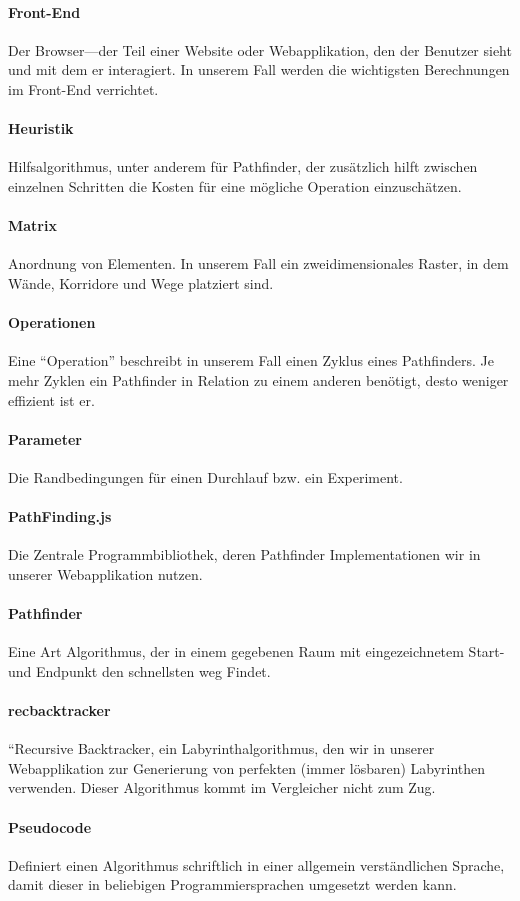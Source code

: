 \paragraph{Front-End} Der Browser---der Teil einer Website oder Webapplikation, den der Benutzer sieht und mit dem er interagiert. In unserem Fall werden die wichtigsten Berechnungen im Front-End verrichtet.
\paragraph{Heuristik} Hilfsalgorithmus, unter anderem für Pathfinder, der zusätzlich hilft zwischen einzelnen Schritten die Kosten für eine mögliche Operation einzuschätzen.
\paragraph{Matrix} Anordnung von Elementen. In unserem Fall ein zweidimensionales Raster, in dem Wände, Korridore und Wege platziert sind.
\paragraph{Operationen} Eine ``Operation'' beschreibt in unserem Fall einen Zyklus eines Pathfinders. Je mehr Zyklen ein Pathfinder in Relation zu einem anderen benötigt, desto weniger effizient ist er.
\paragraph{Parameter} Die Randbedingungen für einen Durchlauf bzw. ein Experiment.
\paragraph{PathFinding.js} Die Zentrale Programmbibliothek, deren Pathfinder Implementationen wir in unserer Webapplikation nutzen.
\paragraph{Pathfinder} Eine Art Algorithmus, der in einem gegebenen Raum mit eingezeichnetem Start- und Endpunkt den schnellsten weg Findet.
\paragraph{recbacktracker} ``Recursive Backtracker, ein Labyrinthalgorithmus, den wir in unserer Webapplikation zur Generierung von perfekten (immer lösbaren) Labyrinthen verwenden. Dieser Algorithmus kommt im Vergleicher nicht zum Zug.
\paragraph{Pseudocode} Definiert einen Algorithmus schriftlich in einer allgemein verständlichen Sprache, damit dieser in beliebigen Programmiersprachen umgesetzt werden kann.

